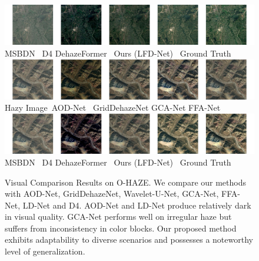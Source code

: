 \documentclass[lettersize,journal]{IEEEtran}
\begin{document}
\begin{figure}[pht]
    \includegraphics[width=14.5cm]{rice_2_2.jpg} \\
    MSBDN \cite{msbdn2020}\quad\quad\quad\, D4\cite{yang2022d4} \quad\quad DehazeFormer\cite{dehazeformer} \;\, Ours (LFD-Net) \quad\, Ground Truth \\
    
    \includegraphics[width=14.5cm]{rice_3_1.jpg} \\
    Hazy Image\qquad\;\ AOD-Net\cite{li2017aod} \;\ GridDehazeNet\cite{liu2019griddehazenet} \;\; GCA-Net\cite{chen2019gated} \quad\; FFA-Net\cite{qin2020ffa}\\   
    
    \includegraphics[width=14.5cm]{rice_3_2.jpg} \\
    MSBDN \cite{msbdn2020}\quad\quad\quad\, D4\cite{yang2022d4} \quad\quad DehazeFormer\cite{dehazeformer} \;\, Ours (LFD-Net) \quad\, Ground Truth \\   
    
    \caption{Visual Comparison Results on O-HAZE. We compare our methods with AOD-Net\cite{li2017aod}, GridDehazeNet\cite{liu2019griddehazenet}, Wavelet-U-Net\cite{yang2019wavelet}, GCA-Net\cite{chen2019gated}, FFA-Net\cite{qin2020ffa}, LD-Net\cite{ullah2021light} and D4\cite{yang2022d4}. AOD-Net and LD-Net produce relatively dark in visual quality. GCA-Net performs well on irregular haze but suffers from inconsistency in color blocks. Our proposed method exhibits adaptability to diverse scenarios and possesses a noteworthy level of generalization. }
    \label{rice}
\end{figure}
\end{document}
